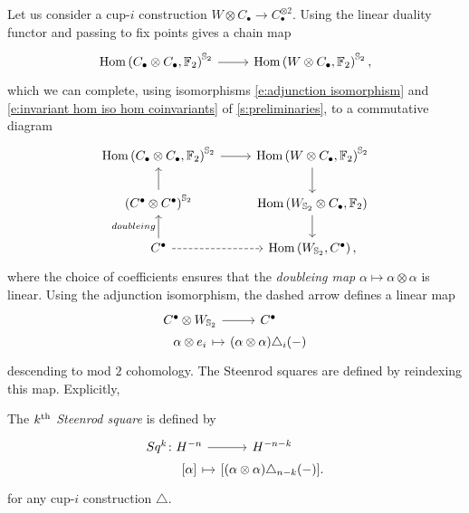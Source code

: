 Let us consider a cup-$i$ construction $W \otimes C_\bullet \to C_\bullet^{\otimes 2}$.
Using the linear duality functor and passing to fix points gives a chain map
\begin{equation*}
\begin{tikzcd}
\Hom\left(C_\bullet \otimes C_\bullet, \Ftwo \right)^{\Sym_2} \arrow[r] &
\Hom\left(W \otimes C_\bullet, \Ftwo \right)^{\Sym_2},
\end{tikzcd}
\end{equation*}
which we can complete, using isomorphisms \eqref{e:adjunction isomorphism} and \eqref{e:invariant hom iso hom coinvariants} of \cref{s:preliminaries}, to a commutative diagram
\begin{equation*}
\begin{tikzcd}
\Hom\left(C_\bullet \otimes C_\bullet, \Ftwo \right)^{\Sym_2} \arrow[r] &
\Hom\left(W \otimes C_\bullet, \Ftwo \right)^{\Sym_2} \arrow[d] \\
\left(C^\bullet \otimes C^\bullet\right)^{\Sym_2} \arrow[u]&
\Hom\left(W_{\Sym_2} \otimes C_\bullet, \Ftwo \right) \arrow[d] \\
C^\bullet \arrow[u, "doubleing"] \arrow[r, dashed]&
\Hom\left(W_{\Sym_2}, C^\bullet\right),
\end{tikzcd}
\end{equation*}
where the choice of coefficients ensures that the \textit{doubleing map} $\alpha \mapsto \alpha \otimes \alpha$ is linear.
Using the adjunction isomorphism, the dashed arrow defines a linear map
\begin{equation} \label{e:Steenrod squares parameterized}
\begin{tikzcd}[row sep=0pt, column sep = small]
C^\bullet \otimes W_{\Sym_2} \arrow[r] &[-10pt] C^\bullet \\
\alpha \otimes e_i \arrow[r, |->] & (\alpha \otimes \alpha)\triangle_i(-)
\end{tikzcd}
\end{equation}
descending to mod $2$ cohomology.
The Steenrod squares are defined by reindexing this map.
Explicitly,
\begin{definition} \label{d:steenrod squares}
	The \textit{$k^{\mathrm{th}}$ Steenrod square} is defined by
	\begin{equation} \label{e:steenrod squares}
	\begin{tikzcd}[row sep=0pt, column sep=tiny]
	Sq^k \colon H^{-n} \arrow[r] & H^{-n-k} \\
	\phantom{Sq^k \colon}{[\alpha]} \arrow[r, |->] & {\left[(\alpha \otimes \alpha)\triangle_{n-k}(-) \right]}.
	\end{tikzcd}
	\end{equation}
	for any cup-$i$ construction $\triangle$.
\end{definition}

